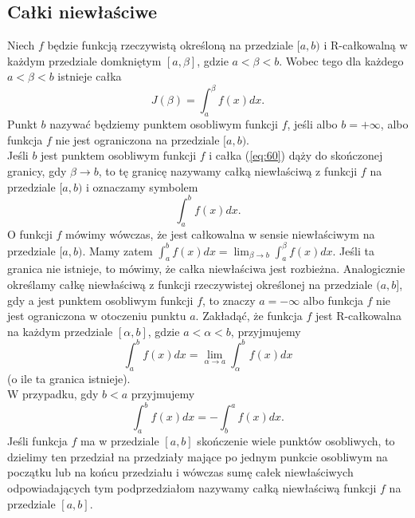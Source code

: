 \documentclass[leqno]{article}
\begin{document}
\begin{justify}
\subsection{Całki niewłaściwe}

\begin{defn}
    Niech $f$ będzie funkcją rzeczywistą określoną na przedziale $[a,b)$ i R-całkowalną w każdym przedziale domkniętym $[a, \beta]$, gdzie
    $a < \beta < b$. Wobec tego dla każdego $a < \beta < b$ istnieje całka
    \begin{equation}\label{eq:60}
        J(\beta) = \int_{a}^{\beta} f(x)dx.
    \end{equation}
    Punkt $b$ nazywać będziemy punktem osobliwym funkcji $f$, jeśli albo $b = +\infty$, albo funkcja $f$ nie jest ograniczona na przedziale $[a, b)$. \\
    Jeśli $b$ jest punktem osobliwym funkcji $f$ i całka (\ref{eq:60}) dąży do skończonej granicy, gdy
    $\beta \to b$, to tę granicę nazywamy całką niewłaściwą z funkcji $f$ na przedziale $[a,b)$ i oznaczamy symbolem
    \[
        \int_{a}^{b}f(x)dx.
    \]
    O funkcji $f$ mówimy wówczas, że jest całkowalna w sensie niewłaściwym na przedziale $[a,b)$. 
    Mamy zatem $\int_{a}^{b}f(x)dx = \lim_{\beta \to b}\int_{a}^{\beta}f(x)dx$. Jeśli ta granica nie istnieje, to mówimy, 
    że całka niewłaściwa jest rozbieżna. Analogicznie określamy całkę niewłaściwą z funkcji rzeczywistej określonej na
    przedziale $(a,b]$, gdy a jest punktem osobliwym funkcji $f$, to znaczy $a = -\infty$ albo funkcja $f$ nie jest ograniczona w otoczeniu punktu $a$.
    Zakładąć, że funkcja $f$ jest R-całkowalna na każdym przedziale $[\alpha, b]$, gdzie $a < \alpha < b$, przyjmujemy
    \[
        \int_{a}^{b}f(x)dx = \lim_{\alpha \to a}\int_{\alpha}^{b}f(x)dx
    \]
    (o ile ta granica istnieje). \\
    W przypadku, gdy $b < a$ przyjmujemy
    \[
        \int_{a}^{b}f(x)dx = -\int_{b}^{a}f(x)dx.
    \]
    Jeśli funkcja $f$ ma w przedziale $[a,b]$ skończenie wiele punktów osobliwych,
    to dzielimy ten przedział na przedziały mające po jednym punkcie osobliwym na początku lub na końcu przedziału i wówczas sumę całek
    niewłaściwych odpowiadających tym podprzedziałom nazywamy całką niewłaściwą funkcji $f$ na przedziale $[a,b]$. 
\end{defn}


\end{justify}
\end{document}

